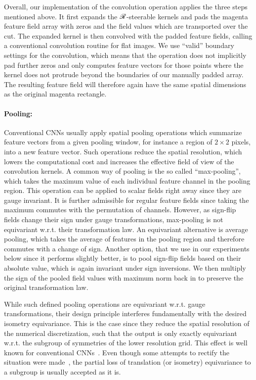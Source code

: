 Overall, our implementation of the convolution operation applies the three steps mentioned above.
It first expands the $\mathscr{R}$-steerable kernels and pads the magenta feature field array with zeros and the field values which are transported over the cut.
The expanded kernel is then convolved with the padded feature fields, calling a conventional convolution routine for flat images.
We use ``valid'' boundary settings for the convolution, which means that the operation does not implicitly pad further zeros and only computes feature vectors for those points where the kernel does not protrude beyond the boundaries of our manually padded array.
The resulting feature field will therefore again have the same spatial dimensions as the original magenta rectangle.



\paragraph{Pooling:}
Conventional CNNs usually apply spatial pooling operations which summarize feature vectors from a given pooling window, for instance a region of $2\times2$ pixels, into a new feature vector.
Such operations reduce the spatial resolution, which lowers the computational cost and increases the effective field of view of the convolution kernels.
A common way of pooling is the so called ``max-pooling'', which takes the maximum value of each individual feature channel in the pooling region.
This operation can be applied to scalar fields right away since they are gauge invariant.
It is further admissible for regular feature fields since taking the maximum commutes with the permutation of channels.
However, as sign-flip fields change their sign under gauge transformations, max-pooling is not equivariant w.r.t. their transformation law.
An equivariant alternative is average pooling, which takes the average of features in the pooling region and therefore commutes with a change of sign.
Another option, that we use in our experiments below since it performs slightly better, is to pool sign-flip fields based on their absolute value, which is again invariant under sign inversions.
We then multiply the sign of the pooled field values with maximum norm back in to preserve the original transformation law.

While such defined pooling operations are equivariant w.r.t. gauge transformations, their design principle interferes fundamentally with the desired isometry equivariance.
This is the case since they reduce the spatial resolution of the numerical discretization, such that the output is only exactly equivariant w.r.t. the subgroup of symmetries of the lower resolution grid.
This effect is well known for conventional CNNs~\cite{azulay2018shift}.
Even though some attempts to rectify the situation were made~\cite{zhang2019CNNsShiftInvariant}, the partial loss of translation (or isometry) equivariance to a subgroup is usually accepted as it is.


